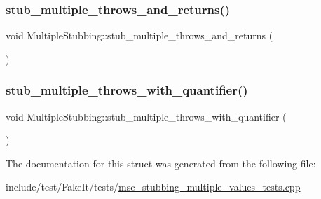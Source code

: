 \subsubsection{\texorpdfstring{stub\_multiple\_throws\_and\_returns()}{stub\_multiple\_throws\_and\_returns()}}
{\footnotesize\ttfamily void Multiple\+Stubbing\+::stub\+\_\+multiple\+\_\+throws\+\_\+and\+\_\+returns (\begin{DoxyParamCaption}{ }\end{DoxyParamCaption})\hspace{0.3cm}{\ttfamily [inline]}}

\mbox{\label{structMultipleStubbing_ac7cd10a739b9606b9bc8a68502da0853}} 
\subsubsection{\texorpdfstring{stub\_multiple\_throws\_with\_quantifier()}{stub\_multiple\_throws\_with\_quantifier()}}
{\footnotesize\ttfamily void Multiple\+Stubbing\+::stub\+\_\+multiple\+\_\+throws\+\_\+with\+\_\+quantifier (\begin{DoxyParamCaption}{ }\end{DoxyParamCaption})\hspace{0.3cm}{\ttfamily [inline]}}



The documentation for this struct was generated from the following file\+:\begin{DoxyCompactItemize}
\item 
include/test/\+Fake\+It/tests/\mbox{\hyperlink{msc__stubbing__multiple__values__tests_8cpp}{msc\+\_\+stubbing\+\_\+multiple\+\_\+values\+\_\+tests.\+cpp}}\end{DoxyCompactItemize}
